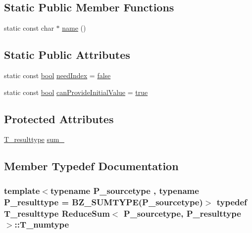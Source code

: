 \subsection*{Static Public Member Functions}
\begin{DoxyCompactItemize}
\item 
static const char $\ast$ \hyperlink{classReduceSum_a0314a5be9b2f90a5f9af3b42f5463a4c}{name} ()
\end{DoxyCompactItemize}
\subsection*{Static Public Attributes}
\begin{DoxyCompactItemize}
\item 
static const \hyperlink{compiler_8h_abb452686968e48b67397da5f97445f5b}{bool} \hyperlink{classReduceSum_ae3451086ae3616fb05793984015788f3}{need\+Index} = \hyperlink{compiler_8h_a65e9886d74aaee76545e83dd09011727}{false}
\item 
static const \hyperlink{compiler_8h_abb452686968e48b67397da5f97445f5b}{bool} \hyperlink{classReduceSum_af734dfbada37890088a708577efc58dd}{can\+Provide\+Initial\+Value} = \hyperlink{compiler_8h_a41f9c5fb8b08eb5dc3edce4dcb37fee7}{true}
\end{DoxyCompactItemize}
\subsection*{Protected Attributes}
\begin{DoxyCompactItemize}
\item 
\hyperlink{classReduceSum_a2d3d58d67dfb475db90aad9fe0c66bf1}{T\+\_\+resulttype} \hyperlink{classReduceSum_a376d084caf4136d445dbf36f60132dbc}{sum\+\_\+}
\end{DoxyCompactItemize}


\subsection{Member Typedef Documentation}
\hypertarget{classReduceSum_a0e862930f1f359e5d61b56501ad4a9b7}{}
\subsubsection[{T\+\_\+numtype}]{\setlength{\rightskip}{0pt plus 5cm}template$<$typename P\+\_\+sourcetype , typename P\+\_\+resulttype  = B\+Z\+\_\+\+S\+U\+M\+T\+Y\+P\+E(\+P\+\_\+sourcetype)$>$ typedef {\bf T\+\_\+resulttype} {\bf Reduce\+Sum}$<$ P\+\_\+sourcetype, P\+\_\+resulttype $>$\+::{\bf T\+\_\+numtype}}\label{classReduceSum_a0e862930f1f359e5d61b56501ad4a9b7}
\hypertarget{classReduceSum_a2d3d58d67dfb475db90aad9fe0c66bf1}{}
